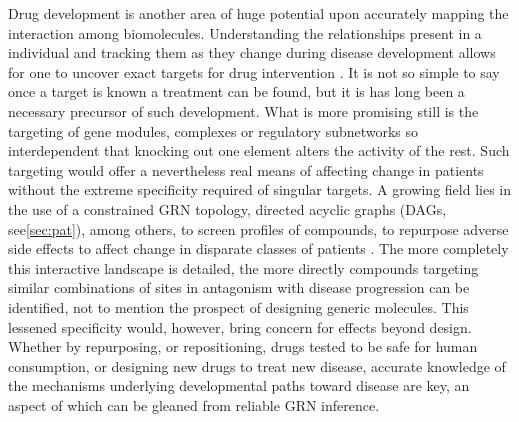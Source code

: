 Drug development is another area of huge potential upon accurately mapping the interaction among biomolecules. Understanding the relationships present in a individual and tracking them as they change during disease development allows for one to uncover exact targets for drug intervention \citep{schreiber2000target}. It is not so simple to say once a target is known a treatment can be found, but it is has long been a necessary precursor of such development. What is more promising still is the targeting of gene modules, complexes or regulatory subnetworks so interdependent that knocking out one element alters the activity of the rest. Such targeting would offer a nevertheless real means of affecting change in patients without the extreme specificity required of singular targets. A growing field lies in the use of a constrained GRN topology, directed acyclic graphs (DAGs, see\cref{sec:pat}), among others, to screen profiles of compounds, to repurpose adverse side effects to affect change in disparate classes of patients \citep{alaimo2016recommendation}. The more completely this interactive landscape is detailed, the more directly compounds targeting similar combinations of sites in antagonism with disease progression can be identified, not to mention the prospect of designing generic molecules. This lessened specificity would, however, bring concern for effects beyond design. Whether by repurposing, or repositioning, drugs tested to be safe for human consumption, or designing new drugs to treat new disease, accurate knowledge of the mechanisms underlying developmental paths toward disease are key, an aspect of which can be gleaned from reliable GRN inference.
